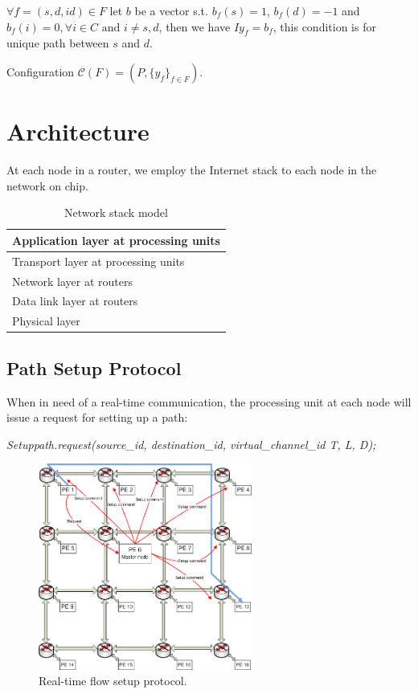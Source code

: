 \documentclass[conference, twocolumn]{IEEEtran}
\theoremstyle{definition}
\begin{document}
$\forall f=(s, d, id) \in F$  let $b$ be a vector s.t. $b_f(s) = 1$, 
$b_f(d) = -1$ and $b_f(i) = 0, \forall i \in C \mbox{ and } i \neq s, d$,
 then we have $Iy_f=b_f$, this condition is for unique path between $s$ and $d$.

Configuration $\mathcal{C}(F)=(P, \{y_f\}_{f \in F})$.
\section{Architecture}
At each node in a router, we employ the Internet stack to each node in the 
network on chip.
\begin{table}[h]
\begin{center}
  \begin{tabular}{ | l | }
    \hline
    Application layer at processing units \\ \hline
    Transport layer at processing units \\ \hline
    Network layer at routers \\ \hline
	Data link layer at routers \\ \hline
	Physical layer \\
    \hline
  \end{tabular}
\end{center}
\caption{Network stack model}
\label{table:NetworkStack}
\end{table}

\subsection{Path Setup Protocol}
When in need of a real-time communication, the processing unit at each node 
will issue a request for setting up a path:

{\em Setuppath.request(source\_id, destination\_id, virtual\_channel\_id T, L,
D);}

\begin{figure}[htp]
\centering
\includegraphics[width=7cm]{pics/Protocol2}
\caption[Setup request for a real-time flow.]
{Real-time flow setup protocol.}\label{fig:ReqSetup}
\end{figure}
\end{document}
